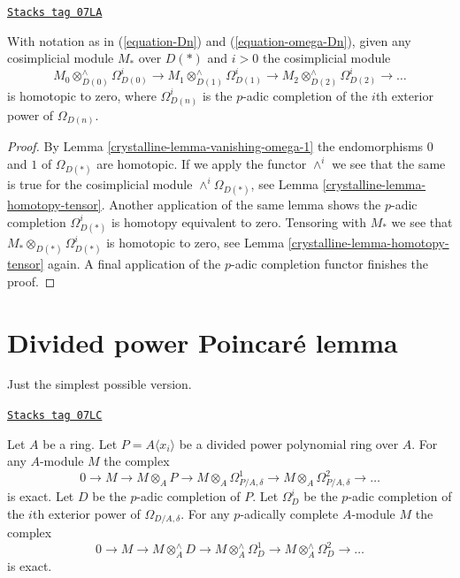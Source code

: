 \begin{lemma}[Vanishing]
\label{crystalline-lemma-vanishing}
\href{https://stacks.math.columbia.edu/tag/07LA}{\texttt{Stacks tag 07LA}}

With notation as in (\ref{equation-Dn}) and (\ref{equation-omega-Dn}),
given any cosimplicial module $M_*$ over $D(*)$ and
$i > 0$ the cosimplicial module
$$
M_0 \otimes^\wedge_{D(0)} \Omega^i_{D(0)} \to
M_1 \otimes^\wedge_{D(1)} \Omega^i_{D(1)} \to
M_2 \otimes^\wedge_{D(2)} \Omega^i_{D(2)} \to \ldots
$$
is homotopic to zero, where $\Omega^i_{D(n)}$ is the $p$-adic completion
of the $i$th exterior power of $\Omega_{D(n)}$.
\end{lemma}

\begin{proof}

By Lemma \ref{crystalline-lemma-vanishing-omega-1} the endomorphisms $0$ and $1$
of $\Omega_{D(*)}$ are homotopic.
If we apply the functor $\wedge^i$ we see that
the same is true for the cosimplicial module $\wedge^i\Omega_{D(*)}$, see
Lemma \ref{crystalline-lemma-homotopy-tensor}.
Another application of the same lemma shows the $p$-adic completion
$\Omega^i_{D(*)}$ is homotopy equivalent to zero.
Tensoring with $M_*$ we see that $M_* \otimes_{D(*)} \Omega^i_{D(*)}$
is homotopic to zero, see Lemma \ref{crystalline-lemma-homotopy-tensor} again.
A final application of the $p$-adic completion functor finishes the proof.
\end{proof}

\section{Divided power Poincar\'e lemma}
\label{crystalline-section-poincare}
Just the simplest possible version.

\begin{lemma}[Poincare]
\label{crystalline-lemma-poincare}
\href{https://stacks.math.columbia.edu/tag/07LC}{\texttt{Stacks tag 07LC}}

Let $A$ be a ring. Let $P = A\langle x_i \rangle$ be a divided
power polynomial ring over $A$. For any $A$-module $M$ the complex
$$
0 \to M \to
M \otimes_A P \to
M \otimes_A \Omega^1_{P/A, \delta} \to
M \otimes_A \Omega^2_{P/A, \delta} \to \ldots
$$
is exact. Let $D$ be the $p$-adic completion of $P$.
Let $\Omega^i_D$ be the $p$-adic completion of the $i$th exterior
power of $\Omega_{D/A, \delta}$. For any $p$-adically complete
$A$-module $M$ the complex
$$
0 \to M \to
M \otimes^\wedge_A D \to
M \otimes^\wedge_A \Omega^1_D \to
M \otimes^\wedge_A \Omega^2_D \to \ldots
$$
is exact.
\end{lemma}

